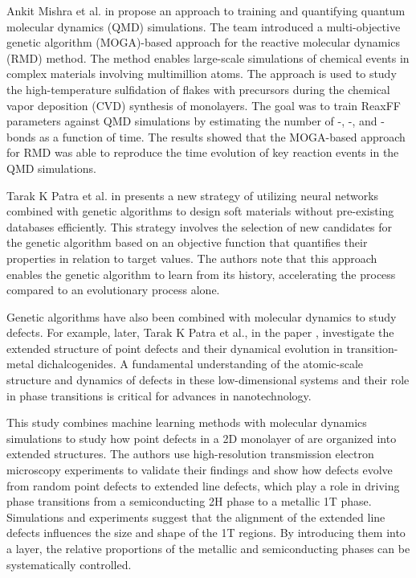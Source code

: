 Ankit Mishra et al. in \cite{mishraMultiobjectiveGeneticTraining2018} propose an approach to training and quantifying quantum molecular dynamics (QMD) simulations. The team introduced a multi-objective genetic algorithm (MOGA)-based approach for the reactive molecular dynamics (RMD) method. The method enables large-scale simulations of chemical events in complex materials involving multimillion atoms. The approach is used to study the high-temperature sulfidation of  flakes with  precursors during the chemical vapor deposition (CVD) synthesis of  monolayers. The goal was to train ReaxFF \cite{vanduinReaxFFReactiveForce2001} parameters against QMD simulations by estimating the number of -, -, and - bonds as a function of time. The results showed that the MOGA-based approach for RMD was able to reproduce the time evolution of key reaction events in the QMD simulations.

Tarak K Patra et al. in \cite{patra2017neural} presents a new strategy of utilizing neural networks combined with genetic algorithms to design soft materials without pre-existing databases efficiently. This strategy involves the selection of new candidates for the genetic algorithm based on an objective function that quantifies their properties in relation to target values. The authors note that this approach enables the genetic algorithm to learn from its history, accelerating the process compared to an evolutionary process alone.

Genetic algorithms have also been combined with molecular dynamics to study defects. For example, later, Tarak K Patra et al., in the paper \cite{patra2018defect}, investigate the extended structure of point defects and their dynamical evolution in transition-metal dichalcogenides. A fundamental understanding of the atomic-scale structure and dynamics of defects in these low-dimensional systems and their role in phase transitions is critical for advances in nanotechnology.

This study combines machine learning methods with molecular dynamics simulations to study how point defects in a 2D monolayer of  are organized into extended structures. The authors use high-resolution transmission electron microscopy experiments to validate their findings and show how defects evolve from random point defects to extended line defects, which play a role in driving phase transitions from a semiconducting 2H phase to a metallic 1T phase. Simulations and experiments suggest that the alignment of the extended line defects influences the size and shape of the 1T regions. By introducing them into a  layer, the relative proportions of the metallic and semiconducting phases can be systematically controlled.

